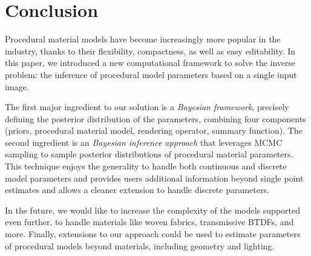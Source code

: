 \section{Conclusion}
\label{sec:conclusion}
%
%
Procedural material models have become increasingly more popular in the industry, thanks to their flexibility, compactness, as well as easy editability.
In this paper, we introduced a new computational framework to solve the inverse problem: the inference of procedural model parameters based on a single input image.

The first major ingredient to our solution is a \emph{Bayesian framework}, precisely defining the posterior distribution of the parameters, combining four components (priors, procedural material model, rendering operator, summary function). The second ingredient is an \emph{Bayesian inference approach} that leverages MCMC sampling to sample posterior distributions of procedural material parameters.  This technique enjoys the generality to handle both continuous and discrete model parameters and provides users additional information beyond single point estimates and allows a cleaner extension to handle discrete parameters.

In the future, we would like to increase the complexity of the models supported even further, to handle materials like woven fabrics, transmissive BTDFs, and more. Finally, extensions to our approach could be used to estimate parameters of procedural models beyond materials, including geometry and lighting.
